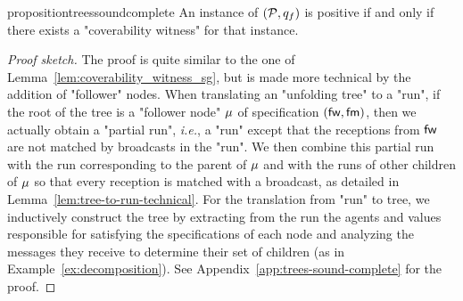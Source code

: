 \begin{restatable}{proposition}{treessoundcomplete}
	\label{prop:trees-sound-complete}
	An instance of \COVER $(\mathcal{P},q_f)$ is positive if and only if there exists a "coverability witness" for that instance.
\end{restatable}
\begin{proof}[Proof sketch]
	The proof is quite similar to the one of Lemma~\ref{lem:coverability_witness_sg}, but is made more technical by the addition of "follower" nodes. 
	When translating an "unfolding tree" to a "run", if the root of the tree is a "follower node" $\mu$ of specification $(\mathsf{fw}, \mathsf{fm})$, then we actually obtain a "partial run", \emph{i.e.}, a "run" except that the receptions from $\mathsf{fw}$ are not matched by broadcasts in the "run". We then combine this partial run with the run corresponding to the parent of $\mu$ and with the runs of other children of $\mu$ so that every reception is matched with a broadcast, as detailed in Lemma~\ref{lem:tree-to-run-technical}.
	For the translation from "run" to tree, we inductively construct the tree by extracting from the run the agents and values responsible for satisfying the specifications of each node and analyzing the messages they receive to determine their set of children (as in Example~\ref{ex:decomposition}). See Appendix~\ref{app:trees-sound-complete} for the proof.
\end{proof}





